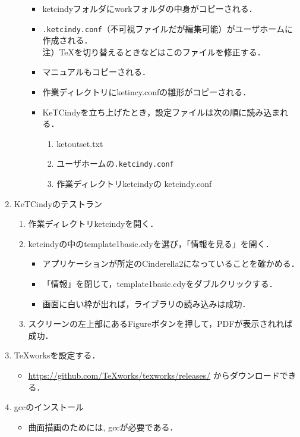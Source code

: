 \documentclass{ujarticle}
\begin{document}
\begin{enumerate}[\bf\large 1.]
\begin{enumerate}[(1)]
\begin{itemize}
    \item ketcindyフォルダにworkフォルダの中身がコピーされる．
    \item \verb|.ketcindy.conf|（不可視ファイルだが編集可能）がユーザホームに作成される．\\
    \hspace*{10mm}注）TeXを切り替えるときなどはこのファイルを修正する．
    \item マニュアルもコピーされる．
    \item 作業ディレクトリにketincy.confの雛形がコピーされる．
    \item KeTCindyを立ち上げたとき，設定ファイルは次の順に読み込まれる．
      \begin{enumerate}[1)]
      \item ketoutset.txt
      \item ユーザホームの\verb|.ketcindy.conf|
      \item 作業ディレクトリketcindyの ketcindy.conf
      \end{enumerate}
    \end{itemize}
  \end{enumerate}
  \item KeTCindyのテストラン
    \begin{enumerate}[(1)]
    \item 作業ディレクトリketcindyを開く．
    \item ketcindyの中のtemplate1basic.cdyを選び，「情報を見る」を開く．
      \begin{itemize}
      \item アプリケーションが所定のCinderella2になっていることを確かめる．
      \item「情報」を閉じて，template1basic.cdyをダブルクリックする．
      \item 画面に白い枠が出れば，ライブラリの読み込みは成功．
      \end{itemize}
    \item スクリーンの左上部にあるFigureボタンを押して，PDFが表示されれば成功．
  \end{enumerate}

\item TeXworksを設定する．
  \begin{itemize}
  \item \url{https://github.com/TeXworks/texworks/releases/} からダウンロードできる．
  \end{itemize}

\item gccのインストール
  \begin{itemize}
    \item 曲面描画のためには, gccが必要である．
  \end{itemize}
\end{enumerate}
\end{document}
